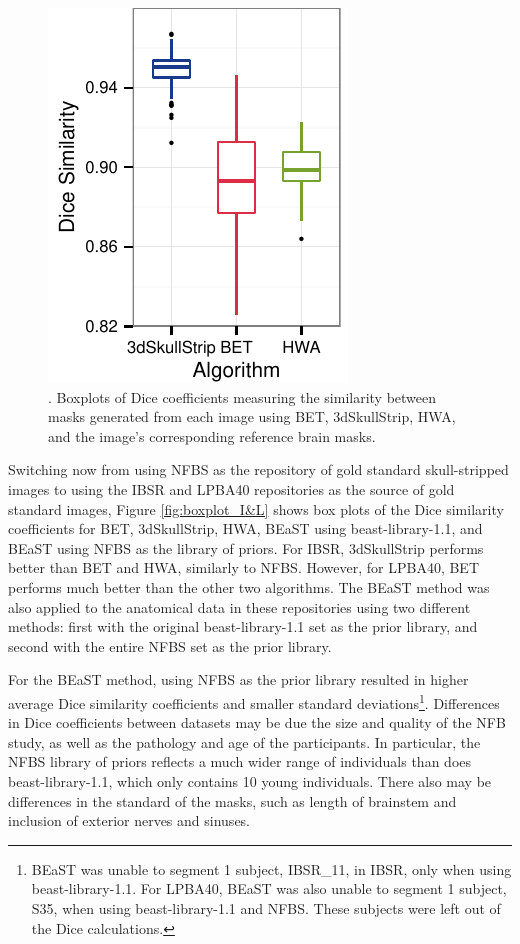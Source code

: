 \begin{figure}[h!]
    \includegraphics[]{boxplot_nfbs.pdf}
    \caption{. Boxplots of Dice coefficients measuring the similarity between masks generated from each image using BET, 3dSkullStrip, HWA, and the image's corresponding reference brain masks. }
    \label{fig:boxplot_NFBS}
\end{figure}

Switching now from using NFBS as the repository of gold standard skull-stripped images to using the IBSR and LPBA40 repositories as the source of gold standard images, Figure \ref{fig:boxplot_I&L} shows box plots of the Dice similarity coefficients for BET, 3dSkullStrip, HWA, BEaST using beast-library-1.1, and BEaST using NFBS as the library of priors. For IBSR, 3dSkullStrip performs better than BET and HWA, similarly to NFBS. However, for LPBA40, BET performs much better than the other two algorithms. The BEaST method was also applied to the anatomical data in these repositories using two different methods: first with the original beast-library-1.1 set as the prior library, and second with the entire NFBS set as the prior library.

For the BEaST method, using NFBS as the prior library resulted in higher average Dice similarity coefficients and smaller standard deviations\footnote{BEaST was unable to segment 1 subject, IBSR\_11, in IBSR, only when using beast-library-1.1. For LPBA40, BEaST was also unable to segment 1 subject, S35, when using beast-library-1.1 and NFBS. These subjects were left out of the Dice calculations.}. Differences in Dice coefficients between datasets may be due the size and quality of the NFB study, as well as the pathology and age of the participants. In particular, the NFBS library of priors reflects a much wider range of individuals than does beast-library-1.1, which only contains 10 young individuals. There also may be differences in the standard of the masks, such as length of brainstem and inclusion of exterior nerves and sinuses.

